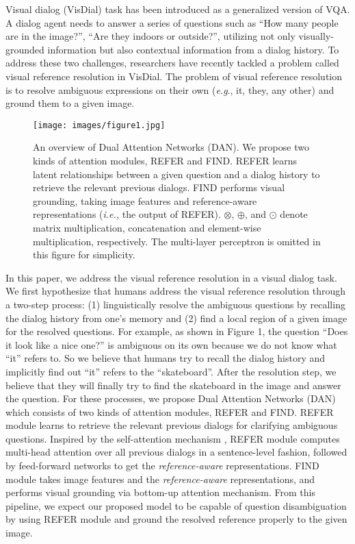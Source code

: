 \documentclass[11pt,a4paper]{article}
\begin{document}
Visual dialog (VisDial) \cite{das2017visual} task has been introduced as a generalized version of VQA. A dialog agent needs to answer a series of questions such as ``How many people are in the image?'', ``Are they indoors or outside?'', utilizing not only visually-grounded information but also contextual information from a dialog history. To address these two challenges, researchers have recently tackled a problem called visual reference resolution in VisDial. The problem of visual reference resolution is to resolve ambiguous expressions on their own ({\it e.g}., it, they, any other) and ground them to a given image. 

\begin{figure*}[ht!]
\label{figure:architecture1}
\centering
\texttt{[image: images/figure1.jpg]}
\caption{An overview of Dual Attention Networks (DAN). We propose two kinds of attention modules, REFER and FIND. REFER learns latent relationships between a given question and a dialog history to retrieve the relevant previous dialogs. FIND performs visual grounding, taking image features and reference-aware representations ({\it i.e.,} the output of REFER). $\otimes$, $\oplus$, and $\odot$ denote matrix multiplication, concatenation and element-wise multiplication, respectively. The multi-layer perceptron is omitted in this figure for simplicity.}
\end{figure*}

In this paper, we address the visual reference resolution in a visual dialog task. We first hypothesize that humans address the visual reference resolution through a two-step process: (1) linguistically resolve the ambiguous questions by recalling the dialog history from one's memory and (2) find a local region of a given image for the resolved questions.  For example, as shown in Figure 1, the question ``Does it look like a nice one?'' is ambiguous on its own because we do not know what ``it'' refers to. So we believe that humans try to recall the dialog history and implicitly find out ``it'' refers to the ``skateboard''. After the resolution step, we believe that they will finally try to find the skateboard in the image and answer the question. For these processes, we propose Dual Attention Networks (DAN) which consists of two kinds of attention modules, REFER and FIND. REFER module learns to retrieve the relevant previous dialogs for clarifying ambiguous questions. Inspired by the self-attention mechanism \cite{vaswani2017attention}, REFER module computes multi-head attention over all previous dialogs in a sentence-level fashion, followed by feed-forward networks to get the {\it reference-aware} representations. FIND module takes image features and the {\it reference-aware} representations, and performs visual grounding via bottom-up attention mechanism. From this pipeline, we expect our proposed model to be capable of question disambiguation by using REFER module and ground the resolved reference properly to the given image. 
\end{document}
